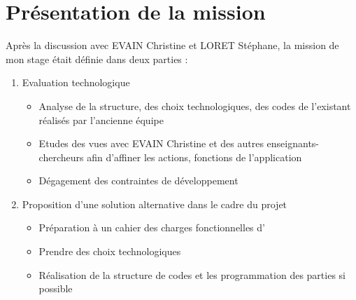 \section{Présentation de la mission}

Après la discussion avec EVAIN Christine et LORET Stéphane, la mission de mon stage était définie dans deux parties :

\begin{enumerate}
    \item Evaluation technologique
    \begin{itemize}
        \item Analyse de la structure, des choix technologiques, des codes de l'existant réalisés par l'ancienne équipe
        \item Etudes des vues avec EVAIN Christine et des autres enseignants-chercheurs afin d'affiner les actions, fonctions de l'application
        \item Dégagement des contraintes de développement
    \end{itemize}    
    \item Proposition d'une solution alternative dans le cadre du projet \ezb\
    \begin{itemize}
        \item Préparation à un cahier des charges fonctionnelles d'\ezb\
        \item Prendre des choix technologiques 
        \item Réalisation de la structure de codes et les programmation des parties si possible
    \end{itemize}
\end{enumerate}